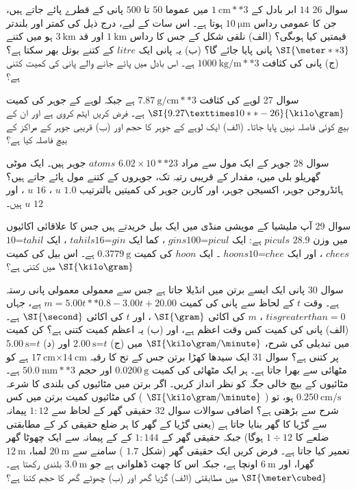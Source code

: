 سوال 26 
\(14\)
ابر بادل کے  
 \(\SI{1}{\centi\meter**3}\)
میں عموما 
\(50\)
تا 
\(500\)
پانی کے قطرے پائے جاتے ہیں، جن کا عمومی رداس 
\(\SI{10}{\micro\meter}\)
ہوتا ہے۔ اس سات کے لیے، درج ذیل کی کمتر اور بلندتر قیمتیں کیا ہوںگی؟ 
(الف) نلقی شکل کے
جس کا  رداس 
\(\SI{1}{\kilo\meter}\) 
اور قد 
 \(\SI{3}{\kilo\meter}\)
ہو میں کتنے 
\(\SI{\meter**3}\)
پانی پایا جائے گا؟ 
(ب) یہ پانی ایک 
\(litre\)
کے کتنے بوتل بھر سکتا ہے؟ 
(ج) پانی کی کثافت 
\(\SI{1000}{\kilo\gram/\meter**3}\) 
ہے۔ اس بادل میں پائے جانے والے پانی کی کمیت کتنی ہے؟ 

سوال 27 
لوہے کی کثافت 
\(\SI{7.87}{\gram/\centi\meter**3}\)
ہے جبکہ لوہے کے جوہر کی کمیت 
\(\SI{9.27×10**-26}{\kilo\gram}\)
ہے۔ فرض کریں ایٹم کروی ہے اور ان کے بیچ کوئی فاصلہ نہیں پایا جاتا۔ 
(الف) ایک لوہے کے جوہر کا حجم اور 
(ب) قریبی جوہر کے مراکز کے بیچ فاصلہ کیا ہے؟ 

سوال 28 
جوہر کے ایک مول سے مراد 
\(6.02×10**23\)
\(atoms\)
جوہر ہیں۔ ایک موٹی گھریلو بلی میں، مقدار کے قریبی رتبہ تک، جوہروں کے کتنے مول پائے جاتے ہیں؟ ہائڈروجن جوہر، اکسیجن جوہر، اور کاربن جوہر کی کمیتیں بالترتیب 
\(1.0\)
\(u\)
، 
\(16\)
\(u\)
، اور 
\(12\)
\(u\) 
ہیں۔ 

سوال 29 
آپ ملیشیا کے مویشی منڈی میں ایک بیل خریدتے ہیں جس کا علاقائی اکائیوں میں وزن 
\(28.9\)
\(piculs\)
ہے: ایک
\(picul\)=\(100\)\(gins\) 
، کما ایک 
\(gin\)=\(16\)\(tahils\) 
، ایک 
\(tahil\)=\(10\)\(chees\)
، اور ایک 
\(chee\)=\(10\)\(hoons\)
۔ ایک 
\(hoon\)
کی کمیت 
\(\SI{0.3779}{\gram}\)
ہے۔ اس بیل کی کمیت 
\(\SI{\kilo\gram}\) 
میں کتنی ہے؟ 

سوال 30 
پانی ایک ایسے برتن میں انڈیلا جاتا ہے جس سے معمولی معمولی پانی رستہ ہے۔ وقت 
\(t\)
کے لحاظ سے پانی کی کمیت 
\(m=5.00t**0.8 - 3.00t + 20.00\)
ہے، جہاں 
\(t is greater than=0\)
، 
\(m\)
کی اکائی 
\(\SI{\gram}\)
، اور 
\(t\) 
کی اکائی 
\(\SI{\second}\)
ہے۔ 
(الف) پانی کی کمیت کس وقت اعظم ہے، اور 
(ب) یہ اعظم کمیت کتنی ہے؟ کن کمیت میں تبدیلی کی شرح، 
\(\SI{\kilo\gram/\minute}\)
میں 
(ج) 
\(t\)=\(\SI{2.00}{\second}\)
اور 
(د) 
 \(t\)=\(\SI{5.00}{\second}\)
پر کتنی ہے؟ 
سوال 31 
ایک سیدھا کھڑا برتن جس کے تح کا رقبہ 
\(\SI{14}{\centi\meter}\)×\(\SI{17}{\centi\meter}\) 
ہے کو مٹھائی سے بھرا جاتا ہے۔ ہر ایک مٹھائی کی کمیت 
\(\SI{0.0200}{\gram}\)
اور حجم 
\(\SI{50.0}{\milli\meter**3}\)
ہے۔ مٹائیوں کے بیچ خالی جگہ کو نظر انداز کریں۔ اگر برتن میں مٹائیوں کی بلندی کا شرعہ  
\(\SI{0.250}{\centi\meter/\second}\)
ہو، تو (
\(\SI{\kilo\gram/\minute}\)
) کی مٹائیوں کمیت برتن میں کس شرح سے بڑھتی ہے؟ 
اضافی سوالات 
سوال 32 
حقیقی گھر کے لحاظ سے 
\(1:12\) 
پیمانہ سے گڑیا کا گھر بنایا جاتا ہے (یعنی گڑیا کے گھر کا ہر ضلع حقیقی کر کے مطابقتی ضلعے کا 
\(1÷12\) 
ہوگا) جبکہ حقیقی گھر کے 
\(1:144\)
کے کے پیمانہ سے ایک چھوٹا گھر تعمیر کیا جاتا ہے۔ فرض کریں ایک حقیقی گھر (شکل 
\(1.7\)
) سامنے سے 
\(\SI{20}{\meter}\)
لمبا، 
\(\SI{12}{\meter}\) 
گھرا، اور 
\(\SI{6}{\meter}\)
اونچا ہے، جبکہ اس کا چھت ڈھلوانی ہے جو 
\(\SI{3.0}{\meter}\)
بلندی رکھتا ہے۔ 
\(\SI{\meter\cubed}\)
میں مطابقتی 
(الف) گڑیا گھر 
اور 
(ب) چھوٹے گھر کا حجم کتنا ہے؟ 
